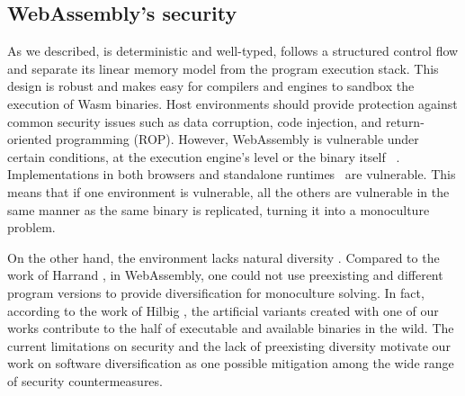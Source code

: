 

\subsection*{WebAssembly's security}

As we described, \wasm is deterministic and well-typed, follows a structured control flow and separate its linear memory model from the program execution stack. This design is robust \cite{WebAssemblySecurity} and makes easy for compilers and engines to sandbox the execution of Wasm binaries.
Host environments should provide protection against common security issues such as data corruption, code injection, and return-oriented programming (ROP). However, WebAssembly is vulnerable under certain conditions, at the execution engine's level \cite{ChromeZero} or the binary itself ~\cite{usenixWasm2020}.
Implementations in both browsers and standalone runtimes~\cite{Narayan2021Swivel} are vulnerable.
This means that if one environment is vulnerable, all the others are vulnerable in the same manner as the same \wasm binary is replicated, turning it into a monoculture problem.


On the other hand, the \wasm environment lacks natural diversity \cite{natural_diversity}. Compared to the work of Harrand \etal \citationneeded, in WebAssembly, one could not use preexisting and different program versions to provide diversification for monoculture solving. In fact, according to the work of Hilbig \etal \cite{Hilbig2021AnES}, the artificial variants created with one of our works contribute to the half of executable and available \wasm binaries in the wild. The current limitations on security and the lack of preexisting diversity motivate our work on software diversification as one possible mitigation among the wide range of security countermeasures. 

